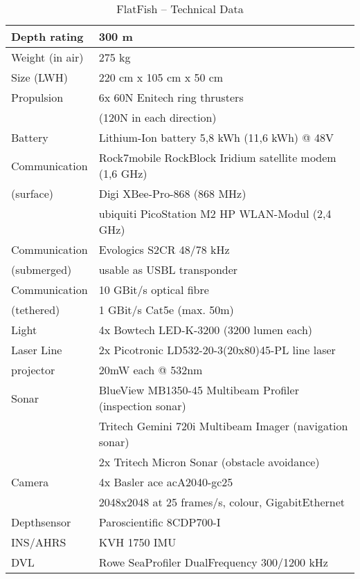 \begin{table}[!t]
\renewcommand{\arraystretch}{1.3}
\caption{FlatFish -- Technical Data}
\label{tab:tech}
\centering
\begin{tabular}{|l|l|}
\hline
Depth rating 	  & 300 m \\ \hline

Weight (in air)		& 275 kg \\ \hline

Size (LWH)			&	220 cm x 105 cm x 50 cm \\ \hline

Propulsion			& 6x 60N Enitech ring thrusters \\
 & (120N in each direction) \\ \hline

Battery	 			&  Lithium-Ion battery 5,8 kWh (11,6 kWh) @ 48V\\ \hline 

Communication & Rock7mobile RockBlock Iridium satellite modem (1,6 GHz) \\
(surface) 		& Digi XBee-Pro-868 (868 MHz)\\
 & ubiquiti PicoStation M2 HP WLAN-Modul (2,4 GHz) \\ \hline

Communication & Evologics S2CR 48/78 kHz \\
(submerged)	&	usable as USBL transponder \\ \hline

Communication & 10 GBit/s optical fibre \\
(tethered)			& 1 GBit/s Cat5e (max. 50m) \\ \hline


Light	& 4x Bowtech LED-K-3200 (3200 lumen each) \\ \hline

Laser Line & 2x Picotronic LD532-20-3(20x80)45-PL line laser \\
projector & 20mW each @ 532nm \\ \hline

Sonar	& BlueView MB1350-45 Multibeam Profiler (inspection sonar) \\
 & Tritech Gemini 720i Multibeam Imager (navigation sonar) \\
 & 2x Tritech Micron Sonar (obstacle avoidance) \\ \hline
  
Camera	& 4x Basler ace acA2040-gc25 \\
	& 2048x2048 at 25 frames/s, colour, GigabitEthernet \\\hline
	
Depthsensor & Paroscientific 8CDP700-I \\ \hline

INS/AHRS & KVH 1750 IMU \\ \hline

DVL &	Rowe SeaProfiler DualFrequency 300/1200 kHz \\ \hline
\end{tabular}
\end{table}
